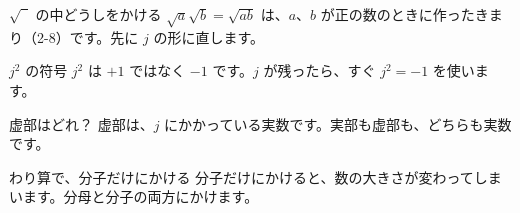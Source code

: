\noindent\begin{minipage}[t]{0.485\linewidth}\vspace{0pt}
\begin{tsumazuki}{$\sqrt{\phantom{2}}$ の中どうしをかける}
$\sqrt a\sqrt b=\sqrt{ab}$ は、$a$、$b$ が正の数のときに作ったきまり（2-8）です。先に $j$ の形に直します。
\end{tsumazuki}
\end{minipage}\hfill
\begin{minipage}[t]{0.485\linewidth}\vspace{0pt}
\begin{tsumazuki}{$j^2$ の符号}
$j^2$ は $+1$ ではなく $-1$ です。$j$ が残ったら、すぐ $j^2=-1$ を使います。
\end{tsumazuki}
\end{minipage}
\par\vspace{2pt}
\noindent\begin{minipage}[t]{0.485\linewidth}\vspace{0pt}
\begin{tsumazuki}{虚部はどれ？}
虚部は、$j$ にかかっている実数です。実部も虚部も、どちらも実数です。
\end{tsumazuki}
\end{minipage}\hfill
\begin{minipage}[t]{0.485\linewidth}\vspace{0pt}
\begin{tsumazuki}{わり算で、分子だけにかける}
分子だけにかけると、数の大きさが変わってしまいます。分母と分子の両方にかけます。
\end{tsumazuki}
\end{minipage}


